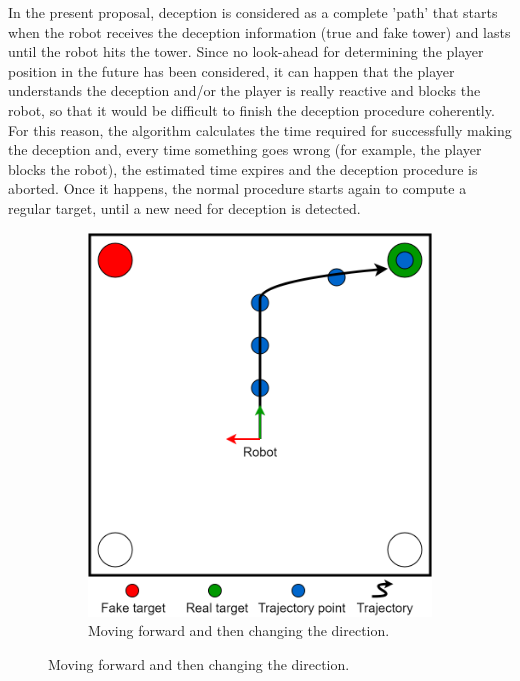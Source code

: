 In the present proposal, deception is considered as a complete 'path' that starts when the robot receives the deception information (true and fake tower) and lasts until the robot hits the tower. Since no look-ahead for determining the player position in the future has been considered, it can happen that the player understands the deception and/or the player is really reactive and blocks the robot, so that it would be difficult to finish the deception procedure coherently.
For this reason, the algorithm calculates the time required for successfully making the deception and, every time something goes wrong (for example, the player blocks the robot), the estimated time expires and the deception procedure is aborted. Once it happens, the normal procedure starts again to compute a regular target, until a new need for deception is detected.
\begin{figure}[H]
\centering
  \begin{subfigure}[t]{0.45\columnwidth}
  \centering
    \includegraphics[width=\linewidth]{images/06-deception/trajectoryLaura}
    \caption{Moving forward and then changing the direction.}
    \label{fig:1}
  \end{subfigure}
  \hspace{0.01\columnwidth}

\end{figure}
